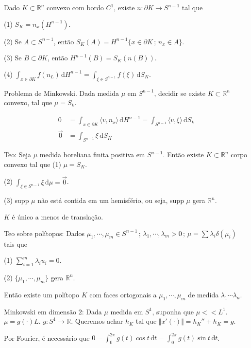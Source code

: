 \documentclass[12pt]{article}
\begin{document}
Dado $K \subset \mathbb{R}^n$ convexo com bordo $C^1$, existe $n : \partial K \to S^{n - 1}$ tal que

(1) $S_K = n_x (H^{n - 1})$.

(2) Se $A \subset S^{n - 1}$, ent\~ao $S_K(A) = H^{n-1} \{ x \in \partial K\,;\,n_x \in A \}$.

(3) Se $B \subset \partial K$, ent\~ao $H^{n-1}(B) = S_K(n(B))$.

(4) $\int_{x \in \partial K} f(n_L)\,\mathrm{d}H^{n - 1} = \int_{\xi \in S^{n - 1}} f(\xi)\,\mathrm{d}S_K$.

\vspace{100mm}

Problema de Minkowski. Dada medida $\mu$ em $S^{n - 1}$, decidir se existe $K \subset \mathbb{R}^n$ convexo, tal que $\mu = S_k$.

\begin{align}
0 &= \int_{x \in \partial K} \langle v, n_x \rangle\,\mathrm{d}H^{n - 1} = \int_{S^{n - 1}} \langle v, \xi \rangle \,\mathrm{d}S_k \\
\vec 0 &= \int_{S^{n - 1}} \xi \,\mathrm{d}S_K
\end{align}

Teo: Seja $\mu$ medida boreliana finita positiva em $S^{n - 1}$. Ent\~ao existe $K \subset \mathbb{R}^n$ corpo convexo tal que (1) $\mu = S_K$.

(2) $\int_{\xi \in S^{n - 1}} \xi\,\mathrm{d}\mu = \vec 0$.

(3) supp $\mu$ n\~ao est\'a contida em um hemisf\'erio, ou seja, supp $\mu$ gera $\mathbb{R}^n$.

$K$ \'e \'unico a menos de transla\c{c}\~ao.

Teo sobre pol\'itopos: Dados $\mu_1, \cdots, \mu_m \in S^{n - 1}\,;\,\lambda_1, \cdots, \lambda_m > 0\,;\,\mu = \sum \lambda_i \delta(\mu_i)$ tais que

(1) $\sum_{i = 1}^m \lambda_i u_i = 0$.

(2) $\{ \mu_1, \cdots, \mu_m \}$ gera $\mathbb{R}^n$.

Ent\~ao existe um pol\'itopo $K$ com faces ortogonais a $\mu_1, \cdots, \mu_m$ de medida $\lambda_1 \cdots \lambda_n$.

Minkowski em dimens\~ao $2$: Dada $\mu$ medida em $S^1$, suponha que $\mu << L^1$. $\mu = g(\cdot) L$. $g : S^1 \to \mathbb{R}$. Queremos achar $h_K$ tal que $\Vert x'(\cdot) \Vert = h_K'' + h_K = g$.

Por Fourier, \'e necess\'ario que $0 = \int_0^{2\pi} g(t)\cos t\,\mathrm{d}t = \int_0^{2\pi} g(t)\sin t\,\mathrm{d}t$.
\end{document}
